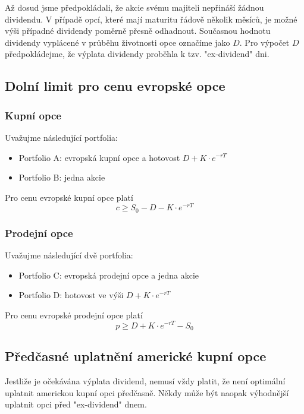 \documentclass[a4paper]{book}
\begin{document}
Až dosud jsme předpokládali, že akcie svému majiteli nepřináší žádnou dividendu. V případě opcí, které mají maturitu řádově několik měsíců, je možné výši případné dividendy poměrně přesně odhadnout. Současnou hodnotu dividendy vyplácené v průběhu životnosti opce označíme jako $D$. Pro výpočet $D$ předpokládejme, že výplata dividendy proběhla k tzv. "ex-dividend" dni.

\subsection{Dolní limit pro cenu evropské opce}

\subsubsection{Kupní opce}

Uvažujme následující portfolia:
\begin{itemize}
\item Portfolio A: evropská kupní opce a hotovost $D + K \cdot e^{-rT}$
\item Portfolio B: jedna akcie
\end{itemize}
Pro cenu evropské kupní opce platí
\begin{equation*}
c \ge S_0 - D - K \cdot e^{-rT}
\end{equation*}

\subsubsection{Prodejní opce}

Uvažujme následující dvě portfolia:
\begin{itemize}
\item Portfolio C: evropská prodejní opce a jedna akcie
\item Portfolio D: hotovost ve výši $D+K \cdot e^{-rT}$
\end{itemize}
Pro cenu evropské prodejní opce platí
\begin{equation*}
p \ge D + K \cdot e^{-rT} - S_0
\end{equation*}

\subsection{Předčasné uplatnění americké kupní opce}
Jestliže je očekávána výplata dividend, nemusí vždy platit, že není optimální uplatnit americkou kupní opci předčasně. Někdy může být naopak výhodnější uplatnit opci před "ex-dividend" dnem.
\end{document}
